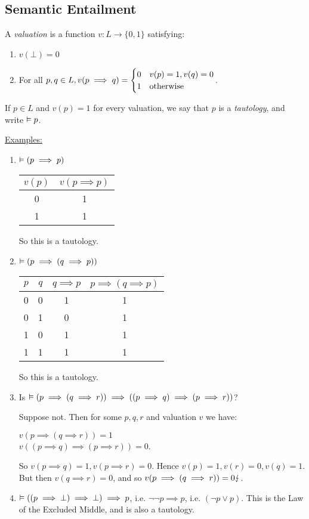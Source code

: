 \documentclass[10pt,a4paper]{article}
\begin{document}
\subsection{Semantic Entailment}
A \emph{valuation} is a function $v: L \to \{0,1\}$ satisfying:
\begin{enumerate}
\item $v(\bot) = 0$
\item For all $p, q \in L, v(p\implies q) = \begin{cases} 0 & v(p) = 1, v(q) = 0 \\ 1 & \text{otherwise} \end{cases}$.
\end{enumerate}
If $p \in L$ and $v(p) = 1$ for every valuation, we say that $p$ is a \emph{tautology}, and write $\vDash p$.

\underline{Examples:}
\begin{enumerate}
\item $\vDash (p \implies p)$

\begin{tabular}{c|c}
$v(p)$ & $v(p\implies p)$ \\\hline
0 & 1 \\
1 & 1
\end{tabular}

So this is a tautology.

\item $\vDash (p \implies (q \implies p))$

\begin{tabular}{c|c|c|c}
$p$ & $q$ & $q \implies p$ & $p \implies (q \implies p)$\\\hline
0 & 0 & 1 & 1\\
0 & 1 & 0 & 1\\
1 & 0 & 1 & 1\\
1 & 1 & 1 & 1
\end{tabular}

So this is a tautology.

\item Is $\vDash (p \implies (q \implies r)) \implies ((p\implies q)\implies(p \implies r))$?

Suppose not. Then for some $p,q,r$ and valuation $v$ we have:

\hspace*{1cm}$v(p \implies (q\implies r)) = 1$\\
\hspace*{1cm}$v((p\implies q)\implies(p \implies r)) = 0$.

So $v(p \implies q) = 1, v(p \implies r) = 0$. Hence $v(p) = 1, v(r) = 0, v(q) = 1$. But then $v(q \implies r) = 0$, and so $v(p \implies(q\implies r)) = 0 \lightning$.

\item $\vDash ((p \implies \bot) \implies \bot) \implies p$, i.e. $ \neg \neg p \implies p$, i.e. $(\neg p \lor p)$. This is the Law of the Excluded Middle, and is also a tautology.
\end{enumerate}
\end{document}
